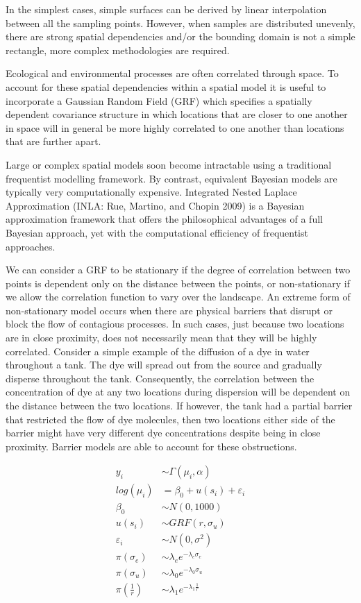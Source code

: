 \documentclass[a4paper]{article}
\begin{document}
In the simplest cases, simple surfaces can be derived by linear
interpolation between all the sampling points. However, when samples are
distributed unevenly, there are strong spatial dependencies and/or the
bounding domain is not a simple rectangle, more complex methodologies
are required.

Ecological and environmental processes are often correlated through
space. To account for these spatial dependencies within a spatial model
it is useful to incorporate a Gaussian Random Field (GRF) which
specifies a spatially dependent covariance structure in which locations
that are closer to one another in space will in general be more highly
correlated to one another than locations that are further apart.

Large or complex spatial models soon become intractable using a
traditional frequentist modelling framework. By contrast, equivalent
Bayesian models are typically very computationally expensive. Integrated
Nested Laplace Approximation (INLA: Rue, Martino, and Chopin 2009) is a
Bayesian approximation framework that offers the philosophical
advantages of a full Bayesian approach, yet with the computational
efficiency of frequentist approaches.

We can consider a GRF to be stationary if the degree of correlation
between two points is dependent only on the distance between the points,
or non-stationary if we allow the correlation function to vary over the
landscape. An extreme form of non-stationary model occurs when there are
physical barriers that disrupt or block the flow of contagious
processes. In such cases, just because two locations are in close
proximity, does not necessarily mean that they will be highly
correlated. Consider a simple example of the diffusion of a dye in water
throughout a tank. The dye will spread out from the source and gradually
disperse throughout the tank. Consequently, the correlation between the
concentration of dye at any two locations during dispersion will be
dependent on the distance between the two locations. If however, the
tank had a partial barrier that restricted the flow of dye molecules,
then two locations either side of the barrier might have very different
dye concentrations despite being in close proximity. Barrier models are
able to account for these obstructions.

\[
\begin{align}
y_i &\sim{} \Gamma(\mu_i, \alpha)\\
log(\mu_i) &= \beta_0 + u(s_i) + \varepsilon_i\\[1em]
\beta_0 &\sim{} N(0,1000)\\
u(s_i) &\sim{} GRF(r, \sigma_u)\\ 
\varepsilon_i &\sim{} N(0, \sigma^2)\\[1em]
\pi(\sigma_e) &\sim{} \lambda_e e^{-\lambda_e \sigma_e}\\
\pi(\sigma_u) &\sim{} \lambda_0 e^{-\lambda_0 \sigma_u}\\
\pi\left(\frac{1}{r}\right) & \sim{} \lambda_1 e^{-\lambda_1 \frac{1}{r}}
\end{align}
\]
\end{document}
